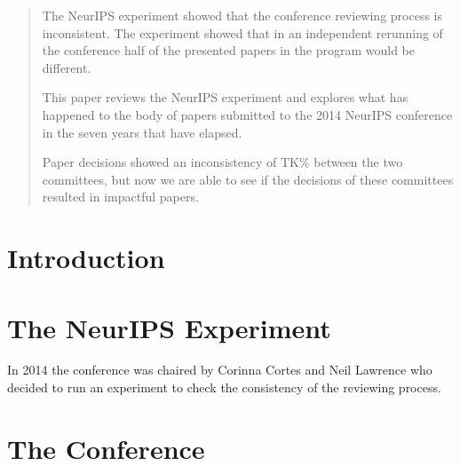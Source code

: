 \documentclass[twoside]{article}
\begin{document}
%

%


\begin{abstract}
    The NeurIPS experiment showed that the conference reviewing process is inconsistent. The experiment showed that in an independent rerunning of the conference half of the presented papers in the program would be different. 
    
    This paper reviews the NeurIPS experiment and explores what has happened to the body of papers submitted to the 2014 NeurIPS conference in the seven years that have elapsed.

    Paper decisions showed an inconsistency of TK\% between the two committees, but now we are able to see if the decisions of these committees resulted in impactful papers.
    
\end{abstract}

\section{Introduction}


\section{The NeurIPS Experiment}

In 2014 the conference was chaired by Corinna Cortes and Neil Lawrence who decided to run an experiment to check the consistency of the reviewing process. 

\section{The Conference}
\end{document}

